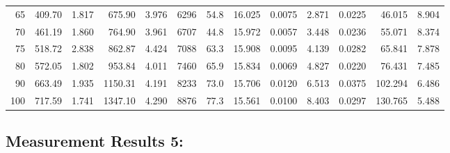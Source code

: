 \documentclass[10pt]{article}
\begin{document}
{\begin{tabular}{|r|rr|rr|rr|rr|rr|r|r|}
       65 &       409.70 &        1.817 &       675.90 &        3.976 &         6296 &         54.8 &       16.025 &       0.0075 &        2.871 &       0.0225 &       46.015 &        8.904 \\
       70 &       461.19 &        1.860 &       764.90 &        3.961 &         6707 &         44.8 &       15.972 &       0.0057 &        3.448 &       0.0236 &       55.071 &        8.374 \\
       75 &       518.72 &        2.838 &       862.87 &        4.424 &         7088 &         63.3 &       15.908 &       0.0095 &        4.139 &       0.0282 &       65.841 &        7.878 \\
       80 &       572.05 &        1.802 &       953.84 &        4.011 &         7460 &         65.9 &       15.834 &       0.0069 &        4.827 &       0.0220 &       76.431 &        7.485 \\
       90 &       663.49 &        1.935 &      1150.31 &        4.191 &         8233 &         73.0 &       15.706 &       0.0120 &        6.513 &       0.0375 &      102.294 &        6.486 \\
      100 &       717.59 &        1.741 &      1347.10 &        4.290 &         8876 &         77.3 &       15.561 &       0.0100 &        8.403 &       0.0297 &      130.765 &        5.488 \\
\hline
\end{tabular}
}



\subsection*{\large \bf Measurement Results 5:}
\end{document}
